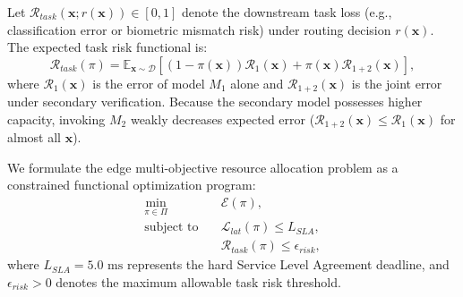 \documentclass[conference]{IEEEtran}
\begin{document}
Let $\mathcal{R}_{task}(\mathbf{x}; r(\mathbf{x})) \in [0, 1]$ denote the downstream task loss (e.g., classification error or biometric mismatch risk) under routing decision $r(\mathbf{x})$. The expected task risk functional is:
\begin{equation}
\mathcal{R}_{task}(\pi) = \mathbb{E}_{\mathbf{x} \sim \mathcal{D}} \left[ (1 - \pi(\mathbf{x})) \mathcal{R}_1(\mathbf{x}) + \pi(\mathbf{x}) \mathcal{R}_{1+2}(\mathbf{x}) \right],
\end{equation}
where $\mathcal{R}_1(\mathbf{x})$ is the error of model $M_1$ alone and $\mathcal{R}_{1+2}(\mathbf{x})$ is the joint error under secondary verification. Because the secondary model possesses higher capacity, invoking $M_2$ weakly decreases expected error ($\mathcal{R}_{1+2}(\mathbf{x}) \le \mathcal{R}_1(\mathbf{x})$ for almost all $\mathbf{x}$).

We formulate the edge multi-objective resource allocation problem as a constrained functional optimization program:
\begin{align}
\min_{\pi \in \Pi} \quad &\mathcal{E}(\pi), \label{eq:opt_obj} \\
\text{subject to} \quad &\mathcal{L}_{lat}(\pi) \le L_{SLA}, \label{eq:opt_lat} \\
&\mathcal{R}_{task}(\pi) \le \epsilon_{risk}, \label{eq:opt_risk}
\end{align}
where $L_{SLA} = 5.0\text{ ms}$ represents the hard Service Level Agreement deadline, and $\epsilon_{risk} > 0$ denotes the maximum allowable task risk threshold.
\end{document}

